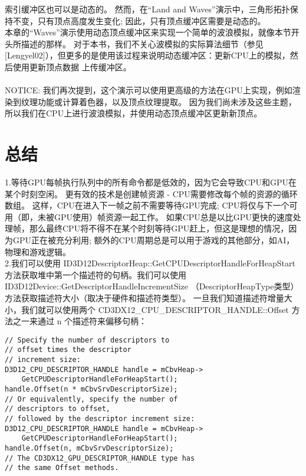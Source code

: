 \begin{flushleft}
索引缓冲区也可以是动态的。 然而，在“Land and Waves”演示中，三角形拓扑保持不变，只有顶点高度发生变化; 因此，只有顶点缓冲区需要是动态的。\\
本章的“Waves”演示使用动态顶点缓冲区来实现一个简单的波浪模拟，就像本节开头所描述的那样。 对于本书，我们不关心波模拟的实际算法细节（参见[Lengyel02]），但更多的是使用该过程来说明动态缓冲区：更新CPU上的模拟，然后使用更新顶点数据 上传缓冲区。\\
~\\
NOTICE: 我们再次提到，这个演示可以使用更高级的方法在GPU上实现，例如渲染到纹理功能或计算着色器，以及顶点纹理提取。 因为我们尚未涉及这些主题，所以我们在CPU上进行波浪模拟，并使用动态顶点缓冲区更新新顶点。
\end{flushleft}



\section{总结}
\begin{flushleft}
1.等待GPU每帧执行队列中的所有命令都是低效的，因为它会导致CPU和GPU在某个时刻空闲。 更有效的技术是创建帧资源 - CPU需要修改每个帧的资源的循环数组。 这样，CPU在进入下一帧之前不需要等待GPU完成; CPU将仅与下一个可用（即，未被GPU使用）帧资源一起工作。 如果CPU总是以比GPU更快的速度处理帧，那么最终CPU将不得不在某个时刻等待GPU赶上，但这是理想的情况，因为GPU正在被充分利用; 额外的CPU周期总是可以用于游戏的其他部分，如AI，物理和游戏逻辑。\\
2.我们可以使用 ID3D12DescriptorHeap::GetCPUDescriptorHandleForHeapStart 方法获取堆中第一个描述符的句柄。我们可以使用 ID3D12Device::GetDescriptorHandleIncrementSize （DescriptorHeapType类型）方法获取描述符大小（取决于硬件和描述符类型）。 一旦我们知道描述符增量大小，我们就可以使用两个 CD3DX12\_CPU\_DESCRIPTOR\_HANDLE::Offset 方法之一来通过 n 个描述符来偏移句柄：\\
\end{flushleft}

\begin{lstlisting}
// Specify the number of descriptors to 
// offset times the descriptor
// increment size:
D3D12_CPU_DESCRIPTOR_HANDLE handle = mCbvHeap->
    GetCPUDescriptorHandleForHeapStart();
handle.Offset(n * mCbvSrvDescriptorSize);
// Or equivalently, specify the number of 
// descriptors to offset,
// followed by the descriptor increment size:
D3D12_CPU_DESCRIPTOR_HANDLE handle = mCbvHeap->
    GetCPUDescriptorHandleForHeapStart();
handle.Offset(n, mCbvSrvDescriptorSize);
// The CD3DX12_GPU_DESCRIPTOR_HANDLE type has 
// the same Offset methods.
\end{lstlisting}

